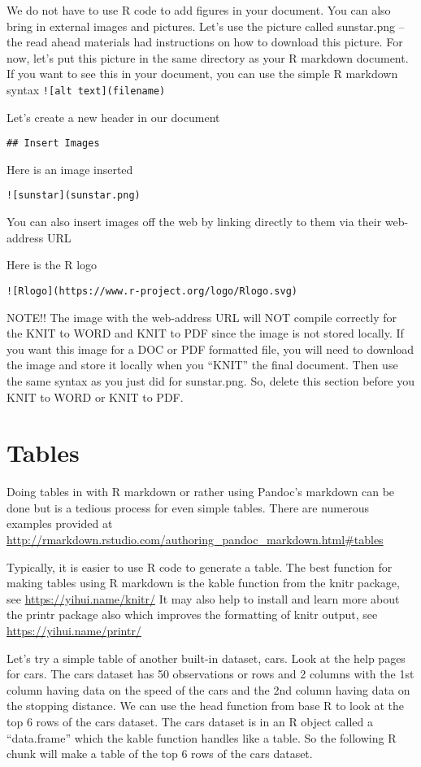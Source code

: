 \documentclass[]{book}
\theoremstyle{definition}
\theoremstyle{definition}
\theoremstyle{definition}
\theoremstyle{remark}
\begin{document}
We do not have to use R code to add figures in your document. You can
also bring in external images and pictures. Let's use the picture called
sunstar.png -- the read ahead materials had instructions on how to
download this picture. For now, let's put this picture in the same
directory as your R markdown document. If you want to see this in your
document, you can use the simple R markdown syntax
\texttt{!{[}alt\ text{]}(filename)}

Let's create a new header in our document

\texttt{\#\#\ Insert\ Images}

Here is an image inserted

\texttt{!{[}sunstar{]}(sunstar.png)}

You can also insert images off the web by linking directly to them via
their web-address URL

Here is the R logo

\texttt{!{[}Rlogo{]}(https://www.r-project.org/logo/Rlogo.svg)}

NOTE!! The image with the web-address URL will NOT compile correctly for
the KNIT to WORD and KNIT to PDF since the image is not stored locally.
If you want this image for a DOC or PDF formatted file, you will need to
download the image and store it locally when you ``KNIT'' the final
document. Then use the same syntax as you just did for sunstar.png. So,
delete this section before you KNIT to WORD or KNIT to PDF.

\section{Tables}\label{tables}

Doing tables in with R markdown or rather using Pandoc's markdown can be
done but is a tedious process for even simple tables. There are numerous
examples provided at
\url{http://rmarkdown.rstudio.com/authoring_pandoc_markdown.html\#tables}

Typically, it is easier to use R code to generate a table. The best
function for making tables using R markdown is the kable function from
the knitr package, see \url{https://yihui.name/knitr/} It may also help
to install and learn more about the printr package also which improves
the formatting of knitr output, see \url{https://yihui.name/printr/}

Let's try a simple table of another built-in dataset, cars. Look at the
help pages for cars. The cars dataset has 50 observations or rows and 2
columns with the 1st column having data on the speed of the cars and the
2nd column having data on the stopping distance. We can use the head
function from base R to look at the top 6 rows of the cars dataset. The
cars dataset is in an R object called a ``data.frame'' which the kable
function handles like a table. So the following R chunk will make a
table of the top 6 rows of the cars dataset.
\end{document}
